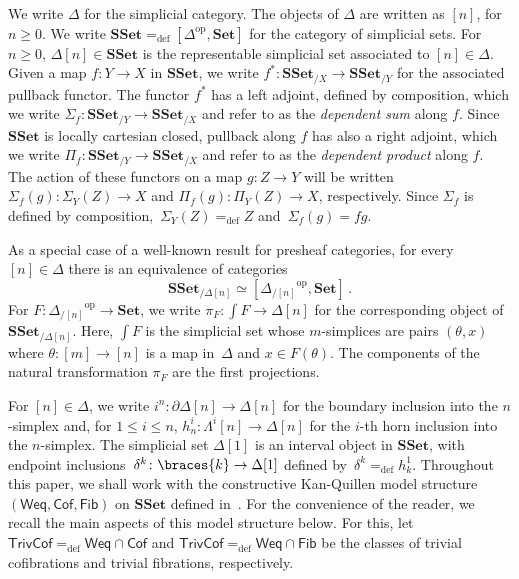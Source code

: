 \documentclass[reqno,10pt,a4paper,oneside,draft]{amsart}
\numberwithin{equation}{section}
\theoremstyle{mythm}
\theoremstyle{mydef}
\theoremstyle{myrmk}
\newcommand{\defeq}{=_{\operatorname{def}}}
\newcommand{\co}{\colon}
\newcommand{\op}{\operatorname{op}}
\newcommand{\SSet}{\mathbf{SSet}}
\newcommand{\Weq}{\mathsf{Weq}}
\newcommand{\Set}{\mathbf{Set}}
\DeclarePairedDelimiter\braces\lbrace\rbrace
\newcommand{\Cof}{\mathsf{Cof}}
\newcommand{\Fib}{\mathsf{Fib}}
\newcommand{\TrivCof}{\mathsf{TrivCof}}
\newcommand{\kcyl}{\delta^k}
\begin{document}
We write $\Delta$ for the simplicial category. The objects of $\Delta$ are written as $[n]$, for $n \geq 0$.
We write $\SSet \defeq [\Delta^{\op}, \Set]$ for the category of simplicial sets. For $n \geq 0$, $\Delta[n] \in \SSet$ is the representable simplicial set associated to $[n] \in \Delta$. Given a map $f \co Y \to X$ in $\SSet$, we write $f^* \co \SSet_{/X} \to \SSet_{/Y}$
for the associated pullback functor. The functor $f^*$ has a left adjoint, defined
by composition, which we write $\Sigma_{f} \co \SSet_{/Y} \to \SSet_{/X}$ and refer
to as the \emph{dependent sum} along $f$. Since $\SSet$ is locally cartesian closed, pullback
along $f$ has also a right adjoint, which we write 
$\Pi_f \co \SSet_{/Y} \to \SSet_{/X}$ and refer to as the \emph{dependent
product}  along $f$. The action of these functors on a
map $g \co Z \to Y$ will be written $\Sigma_f(g) \co \Sigma_Y(Z) \to X$ and 
$\Pi_f(g) \co \Pi_Y(Z) \to X$, respectively. Since  $\Sigma_f$ is defined by composition,~$\Sigma_Y(Z) \defeq Z$ and~$\Sigma_f(g) = fg $. 

As a special case of a well-known result for presheaf 
categories,  for every~$[n] \in \Delta$ there is an equivalence of categories
\begin{equation}
\label{equ:psh-slice-sset}
\SSet_{/\Delta[n]} \simeq  [ {\Delta_{/[n]}}^{\op}, \Set]   \, .
\end{equation}
For $F \co {\Delta_{/[n]}}^{\op} \to \Set$, we write $\pi_F \co \int F \to \Delta[n]$
for the corresponding object of~$\SSet_{/ \Delta[n]}$. Here, $\int F$ is the
simplicial set whose $m$-simplices are pairs $(\theta, x)$ where $\theta \co [m] \to [n]$
is a map in~$\Delta$ and $x \in F(\theta)$. The components of the natural
transformation $\pi_F$ are the first projections.




For $[n] \in \Delta$, we write $i^n \co  \partial \Delta[n] \to \Delta[n]$ for the boundary inclusion into the $n$-simplex and, for $1 \leq i \leq n$,  
$h^i_n  \co \Lambda^i[n] \to \Delta[n]$  for the $i$-th horn inclusion into the $n$-simplex. The simplicial set $\Delta[1]$ is an interval object in $\SSet$, with endpoint inclusions~$\kcyl \co \braces{ k} \to \Delta[1]$ defined by~$\kcyl \defeq h^1_k$. Throughout this paper, we shall work  with the constructive 
Kan-Quillen model structure $(\Weq, \Cof, \Fib)$ on $\SSet$ defined in~\cite{henry2019qms}. 
For the convenience of the reader, we recall the main aspects of this model structure below.
For this, let $\TrivCof \defeq \Weq \cap \Cof$ and $\TrivCof \defeq \Weq \cap \Fib$ be the classes of trivial cofibrations and trivial fibrations,
respectively. 
\end{document}
